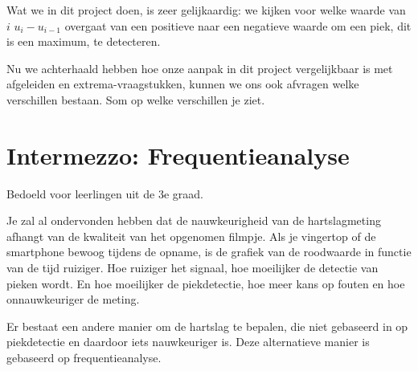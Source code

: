 Wat we in dit project doen, is zeer gelijkaardig: we kijken voor welke waarde van $i$ $u_{i}-u_{i-1}$ overgaat van een positieve naar een negatieve waarde om een piek, dit is een maximum, te detecteren. 

\begin{oef}
	Nu we achterhaald hebben hoe onze aanpak in dit project vergelijkbaar is met afgeleiden en extrema-vraagstukken, kunnen we ons ook afvragen welke verschillen bestaan. Som op welke verschillen je ziet.
\end{oef}

\section{Intermezzo: Frequentieanalyse}
\label{sec:Mod4_Sec3}
%
Bedoeld voor leerlingen uit de 3e graad.

Je zal al ondervonden hebben dat de nauwkeurigheid van de hartslagmeting afhangt van de kwaliteit van het opgenomen filmpje. Als je vingertop of de smartphone bewoog tijdens de opname, is de grafiek van de roodwaarde in functie van de tijd ruiziger. Hoe ruiziger het signaal, hoe moeilijker de detectie van pieken wordt. En hoe moeilijker de piekdetectie, hoe meer kans op fouten en hoe onnauwkeuriger de meting.

Er bestaat een andere manier om de hartslag te bepalen, die niet gebaseerd in op piekdetectie en daardoor iets nauwkeuriger is. Deze alternatieve manier is gebaseerd op frequentieanalyse.

